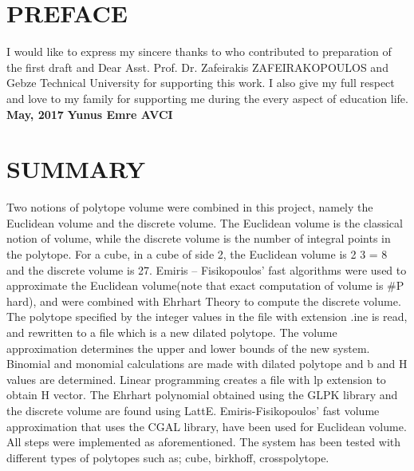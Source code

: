 \documentclass[12pt,twoside]{article}
\newcommand\tab[1][1cm]{\hspace*{#1}}
\begin{document}

\mbox{}
\thispagestyle{empty}
\newpage

\mbox{}
\thispagestyle{empty}
\newpage
{}
\section*{PREFACE} 
I would like to express my sincere thanks to who contributed to preparation of the
first draft and Dear Asst. Prof. Dr. Zafeirakis ZAFEIRAKOPOULOS and Gebze Technical University for supporting this work.
I also give my full respect and love to my family for supporting me during the every
aspect of education life.\newline \newline \newline
\textbf{May, 2017} \tab[7.5cm]
\textbf{Yunus Emre AVCI}


\newpage

\tableofcontents

\newpage
\listoffigures
\newpage
{}
\section*{SUMMARY}
Two notions of polytope volume were combined in this project, namely the
Euclidean volume and the discrete volume. The Euclidean volume is the classical
notion of volume, while the discrete volume is the number of integral points in the
polytope. For a cube, in a cube of side 2, the Euclidean volume is 2 3 = 8 and the
discrete volume is 27.\newline \newline
Emiris – Fisikopoulos' fast algorithms were used to approximate the Euclidean
volume(note that exact computation of volume is \#P hard), and were combined with Ehrhart Theory to compute the discrete volume. The polytope specified by the
integer values in the file with extension .ine is read, and rewritten to a file which is a new dilated polytope. The volume approximation determines the upper and lower
bounds of the new system. Binomial and monomial calculations are made with
dilated polytope and b and H values are determined. Linear programming creates a
file with lp extension to obtain H vector. The Ehrhart polynomial obtained using the
GLPK library and the discrete volume are found using LattE.\newline \newline
Emiris-Fisikopoulos' fast volume approximation that uses the CGAL library, have
been used for Euclidean volume. All steps were implemented as
aforementioned. The system has been tested with different types of polytopes such
as; cube, birkhoff, crosspolytope.
\newpage
{}
\end{document}

